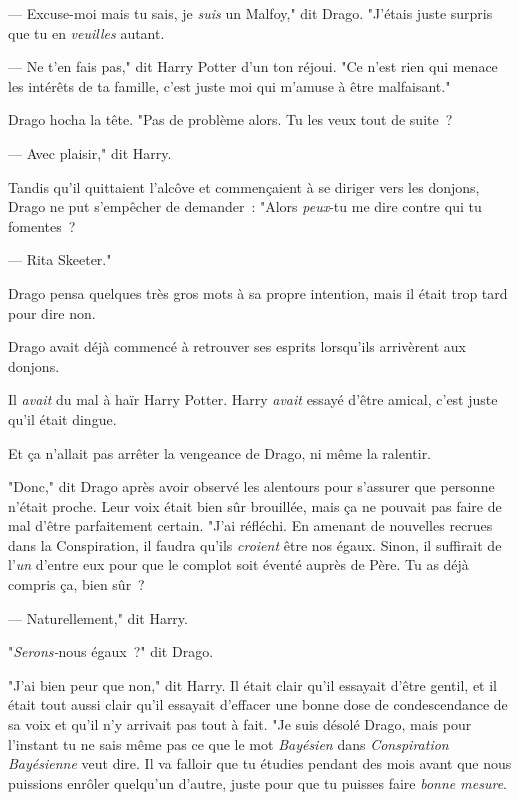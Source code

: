 --- Excuse-moi mais tu sais, je \emph{suis} un Malfoy," dit Drago. "J'étais juste surpris que tu en \emph{veuilles} autant.

--- Ne t'en fais pas," dit Harry Potter d'un ton réjoui. "Ce n'est rien qui menace les intérêts de ta famille, c'est juste moi qui m'amuse à être malfaisant."

Drago hocha la tête. "Pas de problème alors. Tu les veux tout de suite~?

--- Avec plaisir," dit Harry.

Tandis qu'il quittaient l'alcôve et commençaient à se diriger vers les donjons, Drago ne put s'empêcher de demander~: "Alors \emph{peux}-tu me dire contre qui tu fomentes~?

--- Rita Skeeter."

Drago pensa quelques très gros mots à sa propre intention, mais il était trop tard pour dire non.

\later

Drago avait déjà commencé à retrouver ses esprits lorsqu'ils arrivèrent aux donjons.

Il \emph{avait} du mal à haïr Harry Potter. Harry \emph{avait} essayé d'être amical, c'est juste qu'il était dingue.

Et ça n'allait pas arrêter la vengeance de Drago, ni même la ralentir.

"Donc," dit Drago après avoir observé les alentours pour s'assurer que personne n'était proche. Leur voix était bien sûr brouillée, mais ça ne pouvait pas faire de mal d'être parfaitement certain. "J'ai réfléchi. En amenant de nouvelles recrues dans la Conspiration, il faudra qu'ils \emph{croient} être nos égaux. Sinon, il suffirait de l'\emph{un} d'entre eux pour que le complot soit éventé auprès de Père. Tu as déjà compris ça, bien sûr~?

--- Naturellement," dit Harry.

"\emph{Serons-}nous égaux~?" dit Drago.

"J'ai bien peur que non," dit Harry. Il était clair qu'il essayait d'être gentil, et il était tout aussi clair qu'il essayait d'effacer une bonne dose de condescendance de sa voix et qu'il n'y arrivait pas tout à fait. "Je suis désolé Drago, mais pour l'instant tu ne sais même pas ce que le mot \emph{Bayésien} dans \emph{Conspiration} \emph{Bayésienne} veut dire. Il va falloir que tu étudies pendant des mois avant que nous puissions enrôler quelqu'un d'autre, juste pour que tu puisses faire \emph{bonne mesure}.

